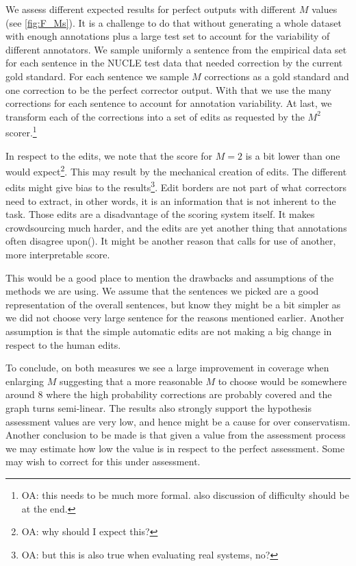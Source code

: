 \documentclass[letter,11pt]{article}
\newcommand{\oa}[1]{\footnote{\color{red}OA: #1}}
\begin{document}
 We assess different expected results for perfect outputs with different
 $M$ values (see \ref{fig:F_Ms}).
 It is a challenge to do that without generating a whole dataset with enough annotations plus a large test
 set to account for the variability of different annotators. We sample uniformly a sentence from the
 empirical data set for each sentence in the NUCLE test data that needed correction by the current gold standard.
 For each sentence we sample $M$ corrections as a gold standard and one correction to be the perfect corrector
 output. With that we use the many corrections for each sentence to account for annotation variability.
 At last, we transform each of the corrections into a set of edits as requested
 by the $M^2$ scorer.\oa{this needs to be much more formal. also discussion
 of difficulty should be at the end.}

 
In respect to the edits, we note that the score for $M=2$ is a bit lower than one would expect\oa{why should I expect this?}. This may result by the mechanical creation of edits. The different edits might give bias to the results\oa{but this is also true when evaluating real systems, no?}. Edit borders are not part of what correctors need to extract, in other words, it is an information that is not inherent to the task. Those edits are a disadvantage of the scoring system itself. It makes crowdsourcing much harder, and the edits are yet another thing that annotations often disagree upon(\cite{dahlmeier2012better}). It might be another reason that calls for use of another, more interpretable score.

This would be a good place to mention the drawbacks and assumptions of the methods we are using. We assume that the sentences we picked are a good representation of the overall sentences, but know they might be a bit simpler as we did not choose very large sentence for the reasons mentioned earlier. Another assumption is that the simple automatic edits are not making a big change in respect to the human edits.

To conclude, on both measures we see a large improvement in coverage when enlarging $M$ suggesting that a more reasonable $M$ to choose would be somewhere around 8 where the high probability corrections are probably covered and the graph turns semi-linear. The results also strongly support the hypothesis assessment values are very low, and hence might be a cause for over conservatism.
 Another conclusion to be made is that given a value from the assessment process we may estimate how low the value is in respect to the perfect assessment. Some may wish to correct for this under assessment.
\end{document}
